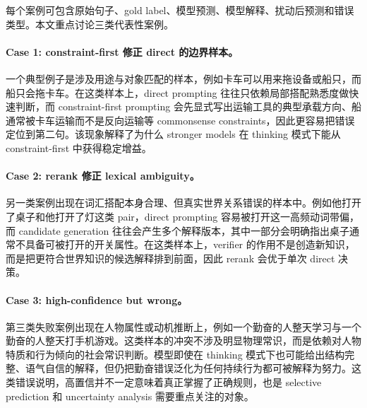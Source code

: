 每个案例可包含原始句子、gold label、模型预测、模型解释、扰动后预测和错误类型。本文重点讨论三类代表性案例。

\paragraph{Case 1: constraint-first 修正 direct 的边界样本。}
一个典型例子是涉及用途与对象匹配的样本，例如卡车可以用来拖设备或船只，而船只会拖卡车。在这类样本上，direct prompting 往往只依赖局部搭配熟悉度做快速判断，而 constraint-first prompting 会先显式写出运输工具的典型承载方向、船通常被卡车运输而不是反向运输等 commonsense constraints，因此更容易把错误定位到第二句。该现象解释了为什么 stronger models 在 thinking 模式下能从 constraint-first 中获得稳定增益。

\paragraph{Case 2: rerank 修正 lexical ambiguity。}
另一类案例出现在词汇搭配本身合理、但真实世界关系错误的样本中。例如他打开了桌子和他打开了灯这类 pair，direct prompting 容易被打开这一高频动词带偏，而 candidate generation 往往会产生多个解释版本，其中一部分会明确指出桌子通常不具备可被打开的开关属性。在这类样本上，verifier 的作用不是创造新知识，而是把更符合世界知识的候选解释排到前面，因此 rerank 会优于单次 direct 决策。

\paragraph{Case 3: high-confidence but wrong。}
第三类失败案例出现在人物属性或动机推断上，例如一个勤奋的人整天学习与一个勤奋的人整天打手机游戏。这类样本的冲突不涉及明显物理常识，而是依赖对人物特质和行为倾向的社会常识判断。模型即使在 thinking 模式下也可能给出结构完整、语气自信的解释，但仍把勤奋错误泛化为任何持续行为都可被解释为努力。这类错误说明，高置信并不一定意味着真正掌握了正确规则，也是 selective prediction 和 uncertainty analysis 需要重点关注的对象。
